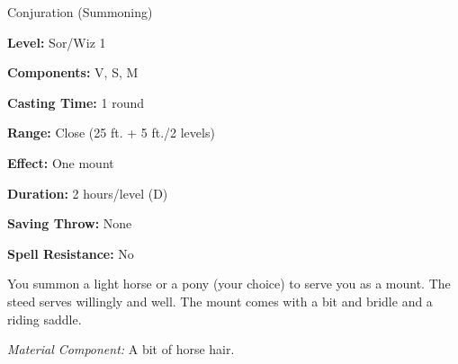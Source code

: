 
Conjuration (Summoning)

\textbf{Level:} Sor/Wiz 1

\textbf{Components:} V, S, M

\textbf{Casting Time:} 1 round

\textbf{Range:} Close (25 ft. + 5 ft./2 levels)

\textbf{Effect:} One mount

\textbf{Duration:} 2 hours/level (D)

\textbf{Saving Throw:} None

\textbf{Spell Resistance:} No

You summon a light horse or a pony (your choice) to serve you as a mount. The steed 
serves willingly and well. The mount comes with a bit and bridle and a riding saddle.

\textit{Material Component:} A bit of horse hair.

